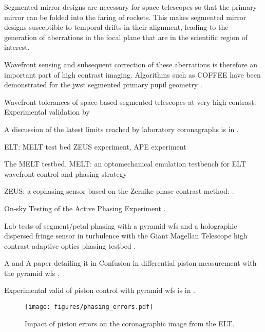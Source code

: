 \documentclass[letterpaper]{ar-1col}
\begin{document}
Segmented mirror designs are necessary for space telescopes so that the primary mirror can be folded into the faring of rockets.
%
%
This makes segmented mirror designs susceptible to temporal drifts in their alignment, leading to the generation of aberrations in the focal plane that are in the scientific region of interest.

Wavefront sensing and subsequent correction of these aberrations is therefore an important part of high contrast imaging.
%
Algorithms such as COFFEE have been demonstrated for the \ac{jwst} segmented primary pupil geometry \citep{Leboulleux20}.


Wavefront tolerances of space-based segmented telescopes at very high contrast: Experimental validation by \citet{Laginja22}

A discussion of the latest limits reached by laboratory coronagraphs is in \citet{Mennesson24}.

ELT: MELT test bed ZEUS experiment, APE experiment

The MELT testbed. MELT: an optomechanical emulation testbench for ELT wavefront control and phasing strategy \citep{Pfrommer18}

ZEUS: a cophasing sensor based on the Zernike phase contrast method: \citep{Dohlen06}.

On-sky Testing of the Active Phasing Experiment  \citet{Gonte09}.


Lab tests of segment/petal phasing with a pyramid \ac{wfs} and a holographic dispersed fringe sensor in turbulence with the Giant Magellan Telescope high contrast adaptive optics phasing testbed \citep{Hedglen22}.

A and A paper detailing it in Confusion in differential piston measurement with the pyramid \ac{wfs} \citep{Bertrou-Cantou22}.

Experimental valid of piston control with pyramid \ac{wfs} is in \citet{Bertrou-Cantou23}. 


\begin{figure}[ht]
  \centering
  \texttt{[image: figures/phasing\_errors.pdf]}
  \caption{Impact of piston errors on the coronagraphic image from the ELT.}
  \label{fig:pistonerror}
\end{figure}
\end{document}
